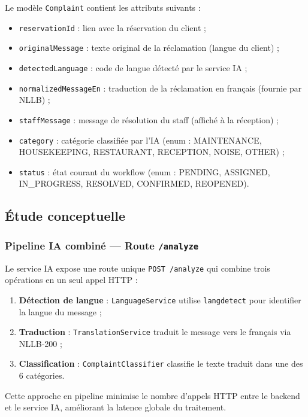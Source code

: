 Le modèle \texttt{Complaint} contient les attributs suivants :
\begin{itemize}
  \item \texttt{reservationId} : lien avec la réservation du client ;
  \item \texttt{originalMessage} : texte original de la réclamation (langue du client) ;
  \item \texttt{detectedLanguage} : code de langue détecté par le service IA ;
  \item \texttt{normalizedMessageEn} : traduction de la réclamation en français (fournie par NLLB) ;
  \item \texttt{staffMessage} : message de résolution du staff (affiché à la réception) ;
  \item \texttt{category} : catégorie classifiée par l'IA (enum : MAINTENANCE, HOUSEKEEPING, RESTAURANT, RECEPTION, NOISE, OTHER) ;
  \item \texttt{status} : état courant du workflow (enum : PENDING, ASSIGNED, IN\_PROGRESS, RESOLVED, CONFIRMED, REOPENED).
\end{itemize}

\subsection{Étude conceptuelle}

\subsubsection{Pipeline IA combiné — Route \texttt{/analyze}}

Le service IA expose une route unique \texttt{POST /analyze} qui combine trois opérations en un seul appel HTTP :

\begin{enumerate}
  \item \textbf{Détection de langue} : \texttt{LanguageService} utilise \texttt{langdetect} pour identifier la langue du message ;
  \item \textbf{Traduction} : \texttt{TranslationService} traduit le message vers le français via NLLB-200 ;
  \item \textbf{Classification} : \texttt{ComplaintClassifier} classifie le texte traduit dans une des 6 catégories.
\end{enumerate}

Cette approche en pipeline minimise le nombre d'appels HTTP entre le backend et le service IA, améliorant la latence globale du traitement.

